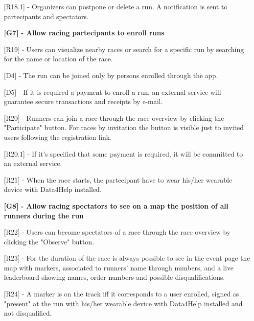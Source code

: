 \hspace{\parindent}[R18.1] - Organizers can postpone or delete a run. A notification is sent to partecipants and spectators. \newline

\hspace{-\parindent}\textbf{[G7] - Allow racing partecipants to enroll runs} \newline

[R19] - Users can visualize nearby races or search for a specific run by searching for the name or location of the race. \newline

[D4] - The run can be joined only by persons enrolled through the app. \newline

[D5] - If it is required a payment to enroll a run, an external service will guarantee secure transactions and receipts by e-mail. \newline

[R20] - Runners can join a race through the race overview by clicking the "Participate" button. For races by invitation the button is visible just to invited users following the registration link. \newline

\hspace{\parindent}[R20.1] - If it's specified that some payment is required, it will be committed to an external service. \newline

[R21] - When the race starts, the partecipant have to wear his/her wearable device with Data4Help installed. \newline

\hspace{-\parindent}\textbf{[G8] - Allow racing spectators to see on a map the position of all runners during the run} \newline

[R22] - Users can become spectators of a race through the race overview by clicking the "Observe" button. \newline

[R23] - For the duration of the race is always possible to see in the event page the map with markers, associated to runners' name through numbers, and a live leaderboard showing names, order numbers and possible disqualifications. \newline

[R24] - A marker is on the track iff it corresponds to a user enrolled, signed as "present" at the run with his/her wearable device with Data4Help installed and not disqualified. \newline

